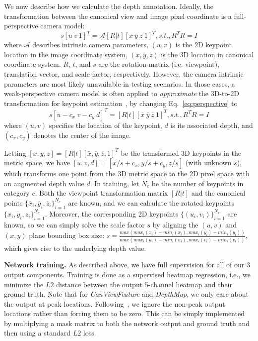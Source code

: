 \documentclass[runningheads]{llncs}
\begin{document}
We now describe how we calculate the depth annotation.
Ideally, the transformation between the canonical view and image pixel coordinate is a full-perspective camera model:
\begin{equation}
s [u \  v \  1]^T = \mathcal{A} [R|t] [\overline{x} \  \overline{y} \  \overline{z} \  1]^T, s.t., R^T R = I
\label{eq:perspective}
\end{equation}
where $\mathcal{A}$ describes intrinsic camera parameters, $(u, v)$ is the 2D keypoint location in the image coordinate system, $(\overline{x}, \overline{y}, \overline{z})$ is the 3D location in canonical coordinate system. $R$, $t$, and $s$ are the rotation matrix (i.e. viewpoint), translation vector, and scale factor, respectively. 
However, the camera intrinsic parameters are most likely unavailable in testing scenarios.
In those cases, a weak-perspective camera model is often applied to \emph{approximate} the 3D-to-2D transformation for keypoint estimation~\cite{Zhou_2017_ICCV,pavlakos20176}, by changing Eq.~\ref{eq:perspective} to
\begin{equation}
s [u - c_x\  v - c_y \  d]^T = [R|t] [\overline{x} \  \overline{y} \  \overline{z} \  1]^T, s.t., R^T R = I
\label{eq:perspective_2}
\end{equation}
where $(u, v)$ specifies the location of the keypoint, $d$ is its associated depth, and $(c_x, c_y)$ denotes the center of the image.

Letting $[{x}, {y}, {z}] = [R|t] [\overline{x}, \overline{y}, \overline{z}, 1]^T$ be the transformed 3D keypoints in the metric space, we have $[u, v, d] = [{x} / s + c_x, {y} / s + c_y, {z} / s]$ (with unknown $s$), which transforms one point from the 3D metric space to the 2D pixel space with an augmented depth value $d$.
In training, let $N_c$ be the number of keypoints in category $c$. Both the viewpoint transformation matrix $[R|t]$ and the canonical points $\{\overline{x}_i, \overline{y}_i, \overline{z}_i\}_{i = 1} ^ {N_c}$ are known, and we can calculate the rotated keypoints $\{{x}_i, {y}_i, {z}_i\}_{i = 1}^{N_c}$. 
Moreover, the corresponding 2D keypoints $\{(u_i, v_i)\}_{i = 1}^{N_c}$ are known, so we can simply solve the scale factor $s$ by aligning the $(u, v)$ and $({x}, {y})$ plane bounding box size:
$s = \frac{max(max_i({x}_i) - min_i({x}_i), max_i({y}_i) - min_i({y}_i))}{max(max_i(u_i) - min_i(u_i), max_i(v_i) - min_i(v_i))}$, which gives rise to the underlying depth value.

\noindent\textbf{Network training.} 
As described above, we have full supervision for all of our 3 output components. 
Training is done as a supervised heatmap regression, i.e., we minimize the $L2$ distance between the output 5-channel heatmap and their ground truth. 
Note that for \emph{CanViewFeature} and \emph{DepthMap}, we only care about the output at peak locations.
Following~\cite{newell2017pixels,newell2017associative}, 
we ignore the non-peak output locations rather than forcing them to be zero.
This can be simply implemented by multiplying a mask matrix to both the network output and ground truth and then using a standard $L2$ loss. 
\end{document}
